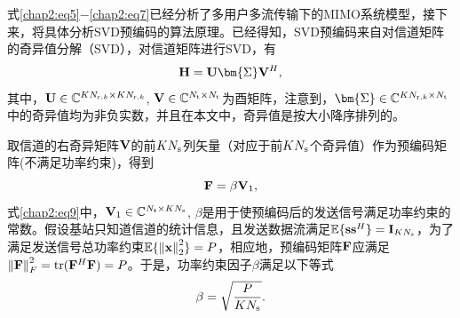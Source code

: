 式\eqref{chap2:eq5}$-$\eqref{chap2:eq7}已经分析了多用户多流传输下的MIMO系统模型，接下来，将具体分析SVD预编码的算法原理。已经得知，SVD预编码来自对信道矩阵的奇异值分解（SVD），对信道矩阵进行SVD，有
\begin{equation}\label{chap2:eq8}
  {\bf{H}}={\bf{U}}{\bm{\Sigma}}{{\bf{V}}^H},
\end{equation}
其中，${{\bf{U}} \in {\mathbb{C}^{K{N_{{\rm{r}},k}} \times K{N_{{\rm{r}},k}}}}}$, ${{\bf{V}} \in {\mathbb{C}^{{N_{\rm{t}}} \times {N_{\rm{t}}}}}}$为酉矩阵，注意到，${{\bm{\Sigma}} \in {\mathbb{C}^{K{N_{{\rm{r}},k}} \times {N_{\rm{t}}}}}}$中的奇异值均为非负实数，并且在本文中，奇异值是按大小降序排列的。

取信道的右奇异矩阵${{\bf{V}}}$的前${K{N_{\rm{s}}}}$列矢量（对应于前${K{N_{\rm{s}}}}$个奇异值）作为预编码矩阵(不满足功率约束)，得到
\begin{equation}\label{chap2:eq9}
  {\bf{F}} = \beta {{\bf{V}}_1},
\end{equation}
式\eqref{chap2:eq9}中，${{\bf{V}}_1 \in {\mathbb{C}^{{N_{\rm{t}}} \times K{N_{\rm{s}}}}}}$, ${\beta}$是用于使预编码后的发送信号满足功率约束的常数。假设基站只知道信道的统计信息，且发送数据流满足${\mathbb{E}\{ {\bf{s}}{{\bf{s}}^H}\}  = {{\bf{I}}_{K{N_{\rm{s}}}}}}$，为了满足发送信号总功率约束${\mathbb{E}\{ \left\| {\bf{x}} \right\|_2^2\}  = P}$，相应地，预编码矩阵${\bf{F}}$应满足${\left\| {\bf{F}} \right\|_F^2 = {\rm{tr}}({{\bf{F}}^H}{\bf{F}})= P}$。于是，功率约束因子${\beta}$满足以下等式
\begin{equation}\label{chap2:eq10}
  \beta  = \sqrt {\frac{P}{{K{N_{\rm{s}}}}}} .
\end{equation}

